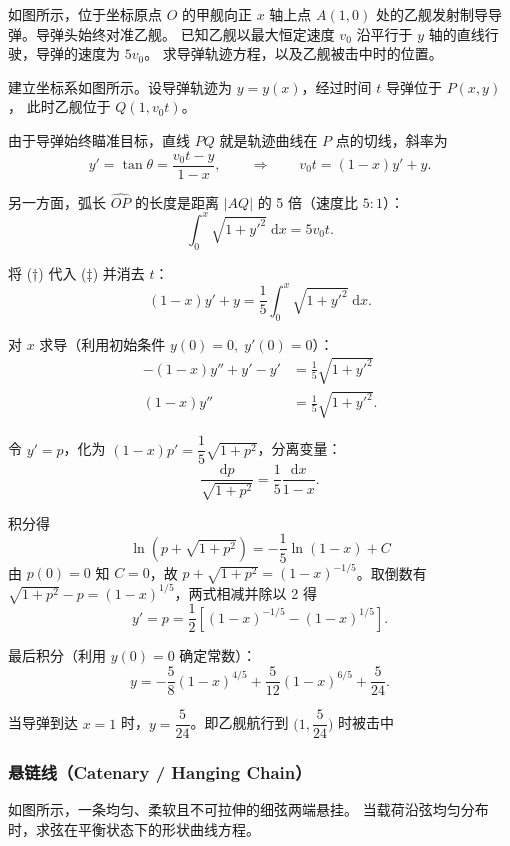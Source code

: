 \documentclass[lang=cn,11pt]{elegantbook}
\begin{document}
\begin{exercise}[导弹追击舰船] \label{ex:ode-pursuit}
如图所示，位于坐标原点 $O$ 的甲舰向正 $x$ 轴上点 $A(1,0)$ 处的乙舰发射制导导弹。导弹头始终对准乙舰。
已知乙舰以最大恒定速度 $v_{0}$ 沿平行于 $y$ 轴的直线行驶，导弹的速度为 $5v_{0}$。
求导弹轨迹方程，以及乙舰被击中时的位置。
\end{exercise}

\begin{solution}
建立坐标系如图所示。设导弹轨迹为 $y=y(x)$，经过时间 $t$ 导弹位于 $P(x,y)$，
此时乙舰位于 $Q(1,v_{0}t)$。

由于导弹始终瞄准目标，直线 $PQ$ 就是轨迹曲线在 $P$ 点的切线，斜率为
\[
y'=\tan\theta=\frac{v_{0}t-y}{1-x},
\qquad\Longrightarrow\qquad v_{0}t=(1-x)y'+y. \tag{†}
\]

另一方面，弧长 $\widehat{OP}$ 的长度是距离 $|AQ|$ 的 5 倍（速度比 $5:1$）：
\[
\int_{0}^{x}\sqrt{1+y'^{2}}\;\mathrm{d}x=5v_{0}t. \tag{‡}
\]

将 (†) 代入 (‡) 并消去 $t$：
\[
(1-x)y'+y=\frac15\int_{0}^{x}\sqrt{1+y'^{2}}\;\mathrm{d}x. \tag{§}
\]

对 $x$ 求导（利用初始条件 $y(0)=0,\;y'(0)=0$）：
\begin{align*}
-(1-x)y''+y'-y' &=\frac15\sqrt{1+y'^{2}} \\
(1-x)y'' &=\frac15\sqrt{1+y'^{2}}.
\end{align*}

令 $y'=p$，化为 $(1-x)p'=\dfrac15\sqrt{1+p^{2}}$，分离变量：
\[
\frac{\mathrm{d}p}{\sqrt{1+p^{2}}}=\frac{1}{5}\frac{\mathrm{d}x}{1-x}.
\]

积分得 
\[
\ln(p+\sqrt{1+p^{2}})=-\frac15\ln(1-x)+C
\]
由 $p(0)=0$ 知 $C=0$，故
$p+\sqrt{1+p^{2}}=(1-x)^{-1/5}$。取倒数有 $\sqrt{1+p^{2}}-p=(1-x)^{1/5}$，两式相减并除以 2 得
\[
y'=p=\frac12\!\left[(1-x)^{-1/5}-(1-x)^{1/5}\right].
\]

最后积分（利用 $y(0)=0$ 确定常数）：
\[
\boxed{
y=-\frac58(1-x)^{4/5}+\frac5{12}(1-x)^{6/5}+\frac{5}{24}.
}
\]

当导弹到达 $x=1$ 时，$y=\dfrac5{24}$。即乙舰航行到 $\bigl(1,\dfrac{5}{24}\bigr)$ 时被击中
\end{solution}


\subsubsection*{悬链线（Catenary / Hanging Chain）}

\begin{exercise}[悬链线的形状] \label{ex:ode-catenary}
如图所示，一条均匀、柔软且不可拉伸的细弦两端悬挂。
当载荷沿弦均匀分布时，求弦在平衡状态下的形状曲线方程。
\end{exercise}
\end{document}
